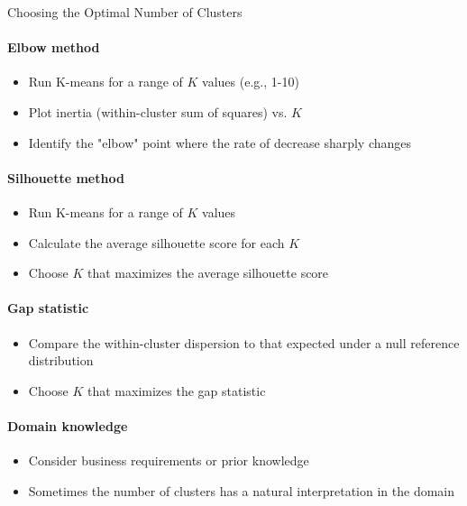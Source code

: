 \begin{KR}{Choosing the Optimal Number of Clusters}\\
\paragraph{Elbow method}
\begin{itemize}
    \item Run K-means for a range of $K$ values (e.g., 1-10)
    \item Plot inertia (within-cluster sum of squares) vs. $K$
    \item Identify the "elbow" point where the rate of decrease sharply changes
\end{itemize}

\paragraph{Silhouette method}
\begin{itemize}
    \item Run K-means for a range of $K$ values
    \item Calculate the average silhouette score for each $K$
    \item Choose $K$ that maximizes the average silhouette score
\end{itemize}

\paragraph{Gap statistic}
\begin{itemize}
    \item Compare the within-cluster dispersion to that expected under a null reference distribution
    \item Choose $K$ that maximizes the gap statistic
\end{itemize}

\paragraph{Domain knowledge}
\begin{itemize}
    \item Consider business requirements or prior knowledge
    \item Sometimes the number of clusters has a natural interpretation in the domain
\end{itemize}
\end{KR}

